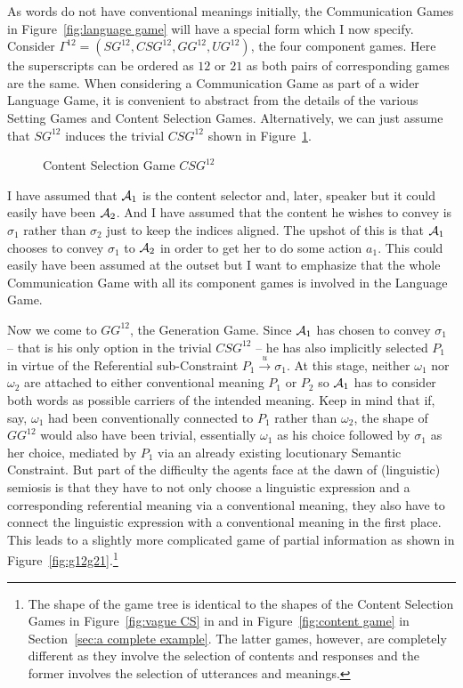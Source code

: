 As words do not have conventional meanings initially, the Communication Games in Figure~\ref{fig:language game} will have a special form which I now specify. Consider $\Gamma^{12} = (SG^{12}, CSG^{12}, GG^{12}, UG^{12})$, the four component games. Here the superscripts can be ordered as $12$ or $21$ as both pairs of corresponding games are the same. When considering a Communication Game as part of a wider Language Game, it is convenient to abstract from the details of the various Setting Games and Content Selection Games. Alternatively, we can just assume that $SG^{12}$ induces the trivial $CSG^{12}$ shown in Figure~\ref{fig:CS12}.


\begin{figure}[h] 

\caption{Content Selection Game $CSG^{12}$}
\label{fig:CS12}
\end{figure}

I have assumed that ${\cal A}_1$ is the content selector and, later, speaker but it could easily have been ${\cal A}_2$. And I have assumed that the content he wishes to convey is $\sigma_1$ rather than $\sigma_2$ just to keep the indices aligned. The upshot of this is that ${\cal A}_1$ chooses to convey $\sigma_1$ to ${\cal A}_2$ in order to get her to do some action $a_1$. This could easily have been assumed at the outset but I want to emphasize that the whole Communication Game with all its component games is involved in the Language Game.

Now we come to $GG^{12}$, the Generation Game. Since ${\cal A}_1$ has chosen to convey $\sigma_1$ -- that is his only option in the trivial $CSG^{12}$ -- he has also implicitly selected $P_1$ in virtue of the Referential sub-Constraint $P_1 \stackrel{u}\longrightarrow \sigma_1$. At this stage, neither $\omega_1$ nor $\omega_2$ are attached to either conventional meaning $P_1$ or $P_2$ so ${\cal A}_1$ has to consider both words as possible carriers of the intended meaning. Keep in mind that if, say, $\omega_1$ had been conventionally connected to $P_1$ rather than $\omega_2$, the shape of $GG^{12}$ would also have been trivial, essentially $\omega_1$ as his choice followed by $\sigma_1$ as her choice, mediated by $P_1$ via an already existing locutionary Semantic Constraint. But part of the difficulty the agents face at the dawn of (linguistic) semiosis is that they have to not only choose a linguistic expression and a corresponding referential meaning via a conventional meaning, they also have to connect the linguistic expression with a conventional meaning in the first place. This leads to a slightly more complicated game of partial information as shown in Figure~\ref{fig:g12g21}.\footnote{The shape of the game tree is identical to the shapes of the Content Selection Games in Figure~\ref{fig:vague CS} in  and in Figure~\ref{fig:content game} in Section~\ref{sec:a complete example}. The latter games, however, are completely different as they involve the selection of contents and responses and the former involves the selection of utterances and meanings.}


